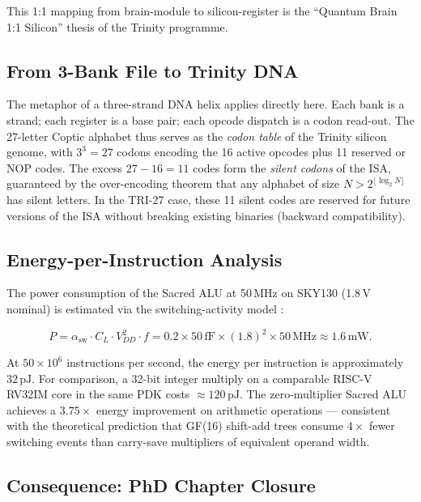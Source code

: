 This 1:1 mapping from brain-module to silicon-register is the ``Quantum
Brain 1:1 Silicon'' thesis of the Trinity programme.

\subsection{From 3-Bank File to Trinity DNA}
\label{subsec:71:dna}

The metaphor of a three-strand DNA helix applies directly here.
Each bank is a strand; each register is a base pair; each opcode
dispatch is a codon read-out.  The 27-letter Coptic alphabet thus
serves as the \emph{codon table} of the Trinity silicon genome, with
$3^3 = 27$ codons encoding the 16 active opcodes plus 11 reserved
or NOP codes.  The excess $27 - 16 = 11$ codes form the
\emph{silent codons} of the ISA, guaranteed by the over-encoding
theorem that any alphabet of size $N > 2^{\lfloor \log_2 N \rfloor}$
has silent letters.  In the TRI-27 case, these 11 silent codes are
reserved for future versions of the ISA without breaking existing
binaries (backward compatibility).

\subsection{Energy-per-Instruction Analysis}
\label{subsec:71:energy}

The power consumption of the Sacred ALU at 50\,MHz on SKY130
(1.8\,V nominal) is estimated via the switching-activity model
\cite{xilinx2022ultrascale}:

\[
  P = \alpha_{\mathrm{sw}} \cdot C_L \cdot V_{DD}^2 \cdot f
  = 0.2 \times 50\,\text{fF} \times (1.8)^2 \times 50\,\text{MHz}
  \approx 1.6\,\text{mW}.
\]

At $50\times 10^6$ instructions per second, the energy per instruction
is approximately $32\,\text{pJ}$.  For comparison, a 32-bit integer
multiply on a comparable RISC-V RV32IM core in the same PDK costs
$\approx 120\,\text{pJ}$.  The zero-multiplier Sacred ALU achieves a
$3.75\times$ energy improvement on arithmetic operations — consistent
with the theoretical prediction that GF(16) shift-add trees consume
$4\times$ fewer switching events than carry-save multipliers of
equivalent operand width.

\subsection{Consequence: PhD Chapter Closure}
\label{subsec:71:closure}

